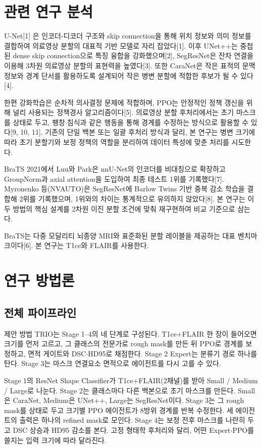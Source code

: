 \documentclass[11pt,a4paper]{article}
\begin{document}
\section{관련 연구 분석}
U-Net[1] 은 인코더-디코더 구조와 skip connection을 통해 위치 정보와 의미 정보를 결합하여 의료영상 분할의 대표적 기반 모델로 자리 잡았다[1]. 이후 UNet++는 중첩된 dense skip connection으로 특징 융합을 강화했으며[2], SegResNet은 잔차 연결을 이용해 3차원 의료영상 분할의 표현력을 높였다[3]. 또한 CaraNet은 작은 표적의 문맥 정보와 경계 단서를 활용하도록 설계되어 작은 병변 분할에 적합한 후보가 될 수 있다[4].

한편 강화학습은 순차적 의사결정 문제에 적합하며, PPO는 안정적인 정책 갱신을 위해 널리 사용되는 정책경사 알고리즘이다[5]. 의료영상 분할 후처리에서는 초기 마스크를 상태로 두고, 팽창$\cdot$침식과 같은 행동을 통해 경계를 수정하는 방식으로 활용할 수 있다[9, 10, 11]. 기존의 단일 백본 또는 일괄 후처리 방식과 달리, 본 연구는 병변 크기에 따라 초기 분할기와 보정 정책의 역할을 분리하여 데이터 특성에 맞춘 처리를 시도한다.

BraTS 2021에서 Luu와 Park은 nnU-Net의 인코더를 비대칭으로 확장하고 GroupNorm과 axial attention을 도입하여 최종 테스트 1위를 기록했다[7]. Myronenko 등(NVAUTO)은 SegResNet에 Barlow Twins 기반 중복 감소 학습을 결합해 2위를 기록했으며, 1위와의 차이는 통계적으로 유의하지 않았다[8]. 본 연구는 이 두 방법의 핵심 설계를 2차원 이진 분할 조건에 맞춰 재구현하여 비교 기준으로 삼는다.

BraTS는 다중 모달리티 뇌종양 MRI와 표준화된 분할 레이블을 제공하는 대표 벤치마크이다[6]. 본 연구는 T1ce와 FLAIR를 사용한다.

\section{연구 방법론}
\subsection{전체 파이프라인}
제안 방법 TRIO는 Stage 1--4의 네 단계로 구성된다. T1ce+FLAIR 한 장이 들어오면 크기를 먼저 고르고, 그 클래스의 전문가로 rough mask를 만든 뒤 PPO로 경계를 보정하고, 면적 게이트와 DSC$\cdot$HD95로 채점한다. Stage 2 Expert는 분류기 경로 하나를 탄다. Stage 3는 마스크 연결요소 면적으로 에이전트를 다시 고를 수 있다.

Stage 1의 ResNet Shape Classifier가 T1ce+FLAIR(2채널)를 받아 Small / Medium / Large로 나눈다. Stage 2는 클래스마다 다른 백본으로 초기 마스크를 만든다. Small은 CaraNet, Medium은 UNet++, Large는 SegResNet이다. Stage 3는 그 rough mask를 상태로 두고 크기별 PPO 에이전트가 8방위 경계를 반복 수정한다. 세 에이전트의 출력은 하나의 refined mask로 모인다. Stage 4는 보정 전후 마스크를 나란히 두고 DSC 상승과 HD95 감소를 본다. 고정 형태학 후처리와 달리, 어떤 Expert$\cdot$PPO를 쓸지는 입력 크기에 따라 달라진다.
\end{document}
